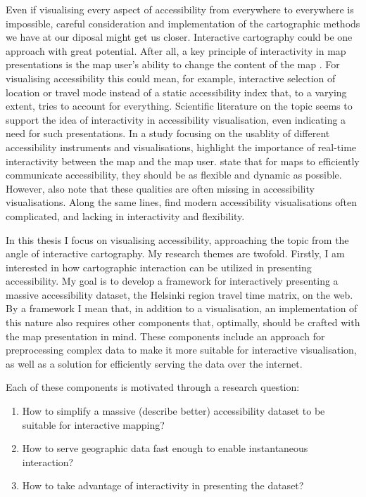 Even if visualising every aspect of accessibility
from everywhere to everywhere is impossible,
careful consideration and implementation
of the cartographic methods we have at our diposal might get us closer.
Interactive cartography could be one approach with great potential.
After all, a key principle of interactivity in map presentations is
the map user's ability to change the content of the map \parencite{rot2013b}.
For visualising accessibility this could mean, for example,
interactive selection of location or travel mode instead of
a static accessibility index that, to a varying extent,
tries to account for everything.
Scientific literature on the topic seems to support the idea of
interactivity in accessibility visualisation,
even indicating a need for such presentations.
In a study focusing on the usablity of
different accessibility instruments and visualisations,  %
\textcite{te2014} highlight the importance of
real-time interactivity between the map and the map user.
\textcite{but2018} state that for maps to efficiently communicate accessibility,
they should be as flexible and dynamic as possible.
However, \textcite{but2018} also note that
these qualities are often missing in accessibility visualisations.
Along the same lines, \textcite{paj2021} find modern accessibility visualisations often complicated,
and lacking in interactivity and flexibility.


In this thesis I focus on visualising accessibility,
approaching the topic from the angle of interactive cartography.
My research themes are twofold.
Firstly, I am interested in how cartographic interaction can be utilized in presenting accessibility.
My goal is to develop a framework for interactively presenting
a massive accessibility dataset, the Helsinki region travel time matrix, on the web.
By a framework I mean that, in addition to a visualisation,
an implementation of this nature also requires other components
that, optimally, should be crafted with the map presentation in mind.
These components include
an approach for preprocessing complex data
to make it more suitable for interactive visualisation,
as well as a solution for efficiently serving the data over the internet.

Each of these components is motivated through a research question:
\begin{enumerate}
	\item How to simplify a massive (describe better) accessibility dataset to be suitable for interactive mapping?
	\item How to serve geographic data fast enough to enable instantaneous interaction?
	\item How to take advantage of interactivity in presenting the dataset?
\end{enumerate}

